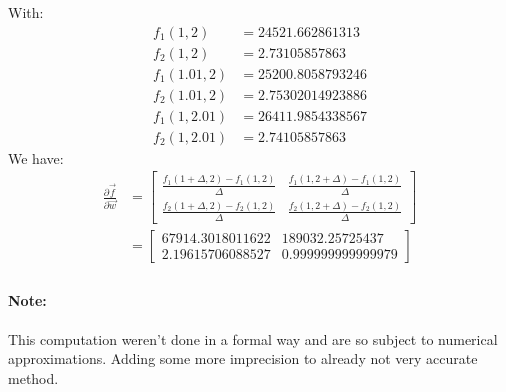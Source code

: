 With:
\begin{align*}
    f_1(1,2) &= 24521.662861313 \\
    f_2(1,2) &= 2.73105857863 \\
    f_1(1.01,2) &= 25200.8058793246 \\
    f_2(1.01,2) &= 2.75302014923886 \\
    f_1(1,2.01) &= 26411.9854338567 \\
    f_2(1,2.01) &= 2.74105857863
\end{align*}
We have:
\begin{align*}
    \frac{\partial \vec{f}}{\partial \vec{w}} &=
    \begin{bmatrix}
        \frac{f_1(1 + \Delta,2) - f_1(1,2)}{\Delta} & \frac{f_1(1,2 + \Delta) - f_1(1,2)}{\Delta} \\
        \frac{f_2(1 + \Delta,2) - f_2(1,2)}{\Delta} & \frac{f_2(1,2 + \Delta) - f_2(1,2)}{\Delta}
    \end{bmatrix} \\
    &=
    \begin{bmatrix}
        67914.3018011622 & 189032.25725437 \\
        2.19615706088527 & 0.999999999999979
    \end{bmatrix} \\
\end{align*}

\paragraph{Note:}
This computation weren't done in a formal way and are so subject to numerical approximations.
Adding some more imprecision to already not very accurate method.


